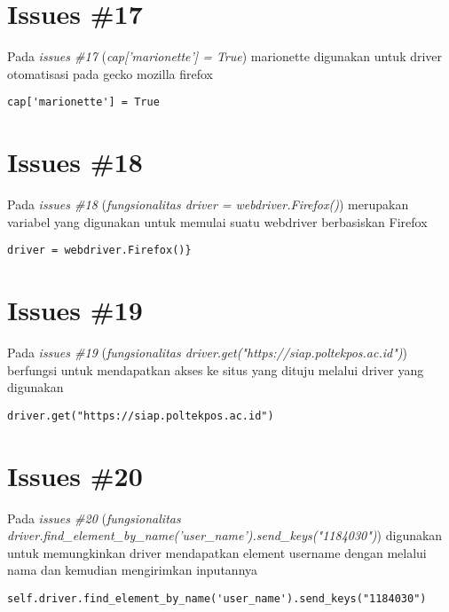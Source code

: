 \section{Issues \#17}
Pada \textit{issues \#17} (\textit{cap['marionette'] = True}) 
marionette digunakan untuk driver otomatisasi pada gecko mozilla firefox
\begin{verbatim}
cap['marionette'] = True
\end{verbatim}
\section{Issues \#18}
Pada \textit{issues \#18} (\textit{fungsionalitas driver = webdriver.Firefox()}) merupakan variabel yang digunakan untuk memulai suatu webdriver berbasiskan Firefox
\begin{verbatim}
driver = webdriver.Firefox()}
\end{verbatim}
\section{Issues \#19}
Pada \textit{issues \#19} (\textit{fungsionalitas driver.get("https://siap.poltekpos.ac.id")}) 
berfungsi untuk mendapatkan akses ke situs yang dituju melalui driver yang digunakan
\begin{verbatim}
driver.get("https://siap.poltekpos.ac.id")
\end{verbatim}
\section{Issues \#20}
Pada \textit{issues \#20} (\textit{fungsionalitas driver.find\_element\_by\_name('user\_name').send\_keys("1184030")}) digunakan untuk memungkinkan driver mendapatkan element username dengan melalui nama dan kemudian mengirimkan inputannya
\begin{verbatim}
self.driver.find_element_by_name('user_name').send_keys("1184030")
\end{verbatim}